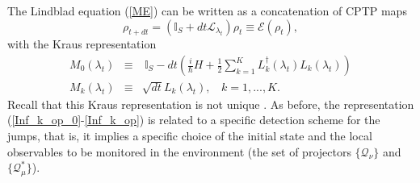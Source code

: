 \documentclass[aps,prx,twocolumn,showpacs,floatfix,superscriptaddress,graphics,longbibliography]{revtex4-1}
\newcommand{\E}{{\mathcal E}}
\newcommand{\HAT}{}
\begin{document}
The Lindblad  equation (\ref{ME}) can be written as a concatenation of CPTP maps
\begin{equation}\label{inf-time-ev}
 \rho_{t + dt} = \left( \mathbb{I}_S + dt \mathcal{L}_{\lambda_t} \right) \rho_t \equiv \E (\rho_t),
\end{equation}
with the  Kraus representation 
\begin{eqnarray}\label{Inf_k_op_0}
\HAT{M}_0(\lambda_t) &\equiv& ~\mathbb{I}_S - dt\left(\frac{i}{\hbar}H +  \frac{1}{2}\sum_{k=1}^K \HAT{L}_k^\dagger(\lambda_t) \HAT{L}_k(\lambda_t) \right) \\ \label{Inf_k_op}
\HAT{M}_k(\lambda_t) &\equiv& \sqrt{dt} \HAT{L}_k(\lambda_t),  ~~~~ k=1, ..., K.
\end{eqnarray}
Recall that this Kraus representation is not unique \cite{Wiseman}. As before, the representation (\ref{Inf_k_op_0}-\ref{Inf_k_op})  is related to a specific detection scheme for the jumps, that is, it implies a specific choice of the initial state and the local 
observables to be monitored  in the environment (the set of projectors $\{ \HAT{\mathcal{Q}}_\nu \}$ and $\{ \HAT{\mathcal{Q}}^\ast_\mu \}$).
\end{document}
